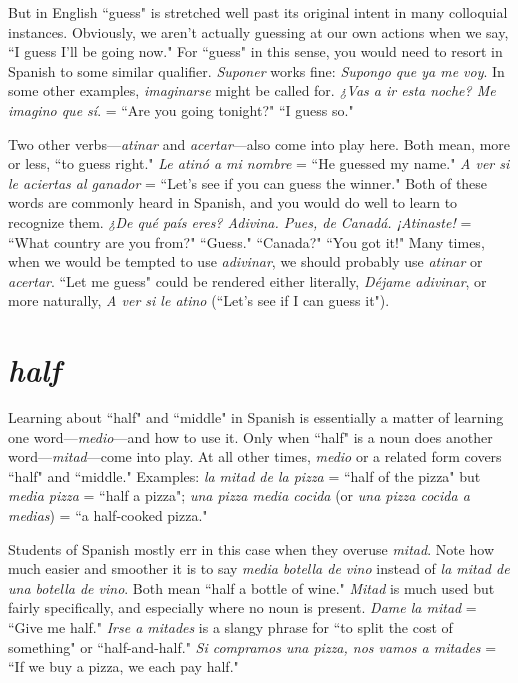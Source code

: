But in English ``guess" is stretched well past its original intent
in many colloquial instances. Obviously, we aren't actually guessing at
our own actions when we say, ``I guess I'll be going now." For ``guess"
in this sense, you would need to resort in Spanish to some similar
qualifier. \emph{Suponer} works fine: \emph{Supongo que ya me voy}. In some other
examples, \emph{imaginarse} might be called for. \emph{¿Vas a ir esta noche? Me
imagino que sí}. = ``Are you going tonight?" ``I guess so."

Two other verbs---\emph{atinar} and \emph{acertar}---also come into play
here. Both mean, more or less, ``to guess right." \emph{Le atinó a mi nombre}
= ``He guessed my name." \emph{A ver si le aciertas al ganador} = ``Let's see
if you can guess the winner." Both of these words are commonly heard
in Spanish, and you would do well to learn to recognize them. \emph{¿De qué
país eres? Adivina. Pues, de Canadá. ¡Atinaste!} = ``What country are
you from?" ``Guess." ``Canada?" ``You got it!" Many times, when we
would be tempted to use \emph{adivinar}, we should probably use \emph{atinar} or
\emph{acertar}. ``Let me guess" could be rendered either literally, \emph{Déjame adivinar}, or more naturally, \emph{A ver si le atino} (``Let's see if I can guess it").

\section{\emph{half}}

Learning about ``half" and ``middle" in Spanish is essentially a
matter of learning one word---\emph{medio}---and how to use it. Only when
``half" is a noun does another word---\emph{mitad}---come into play. At all
other times, \emph{medio} or a related form covers ``half" and ``middle." Examples: \emph{la mitad de la pizza} = ``half of the pizza" but \emph{media pizza} =
``half a pizza"; \emph{una pizza media cocida} (or \emph{una pizza cocida a medias})
= ``a half-cooked pizza."

Students of Spanish mostly err in this case when they overuse
\emph{mitad}. Note how much easier and smoother it is to say \emph{media botella
de vino} instead of \emph{la mitad de una botella de vino}. Both mean ``half a
bottle of wine." \emph{Mitad} is much used but fairly specifically, and especially where no noun is present. \emph{Dame la mitad} = ``Give me half."
\emph{Irse a mitades} is a slangy phrase for ``to split the cost of something" or
``half-and-half." \emph{Si compramos una pizza, nos vamos a mitades} = ``If
we buy a pizza, we each pay half."

